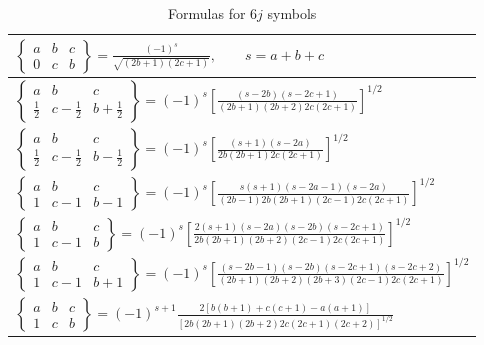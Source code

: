 \begin{table}[p]
\centering\small
\caption{Formulas for $6j$ symbols}
\label{tab:10}
\renewcommand{\arraystretch}{1.55}
\begin{tabular}{@{}l@{}}
\hline
$\displaystyle \left\{\begin{matrix}a&b&c\\0&c&b\end{matrix}\right\}=\frac{(-1)^s}{\sqrt{(2b+1)(2c+1)}},\qquad s=a+b+c$\\ \hline
$\displaystyle \left\{\begin{matrix}a&b&c\\\frac12&c-\frac12&b+\frac12\end{matrix}\right\}=(-1)^s\left[\frac{(s-2b)(s-2c+1)}{(2b+1)(2b+2)2c(2c+1)}\right]^{1/2}$\\
$\displaystyle \left\{\begin{matrix}a&b&c\\\frac12&c-\frac12&b-\frac12\end{matrix}\right\}=(-1)^s\left[\frac{(s+1)(s-2a)}{2b(2b+1)2c(2c+1)}\right]^{1/2}$\\ \hline
$\displaystyle \left\{\begin{matrix}a&b&c\\1&c-1&b-1\end{matrix}\right\}=(-1)^s\left[\frac{s(s+1)(s-2a-1)(s-2a)}{(2b-1)2b(2b+1)(2c-1)2c(2c+1)}\right]^{1/2}$\\
$\displaystyle \left\{\begin{matrix}a&b&c\\1&c-1&b\end{matrix}\right\}=(-1)^s\left[\frac{2(s+1)(s-2a)(s-2b)(s-2c+1)}{2b(2b+1)(2b+2)(2c-1)2c(2c+1)}\right]^{1/2}$\\
$\displaystyle \left\{\begin{matrix}a&b&c\\1&c-1&b+1\end{matrix}\right\}=(-1)^s\left[\frac{(s-2b-1)(s-2b)(s-2c+1)(s-2c+2)}{(2b+1)(2b+2)(2b+3)(2c-1)2c(2c+1)}\right]^{1/2}$\\
$\displaystyle \left\{\begin{matrix}a&b&c\\1&c&b\end{matrix}\right\}=(-1)^{s+1}\frac{2[b(b+1)+c(c+1)-a(a+1)]}{[2b(2b+1)(2b+2)2c(2c+1)(2c+2)]^{1/2}}$\\ \hline
\end{tabular}
\end{table}

